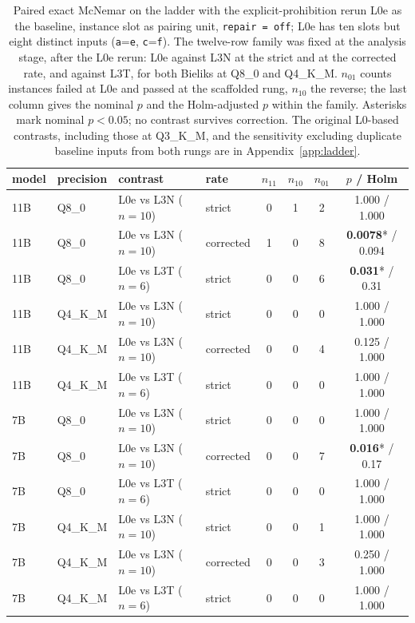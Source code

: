 \documentclass[11pt]{article}
\begin{document}
\begin{table}[h]
\centering\small
\caption{Paired exact McNemar on the ladder with the explicit-prohibition rerun L0e as the baseline, instance slot as pairing unit, \texttt{repair\,=\,off}; L0e has ten slots but eight distinct inputs (\texttt{a}=\texttt{e}, \texttt{c}=\texttt{f}). The twelve-row family was fixed at the analysis stage, after the L0e rerun: L0e against L3N at the strict and at the corrected rate, and against L3T, for both Bieliks at Q8\_0 and Q4\_K\_M. $n_{01}$ counts instances failed at L0e and passed at the scaffolded rung, $n_{10}$ the reverse; the last column gives the nominal $p$ and the Holm-adjusted $p$ within the family. Asterisks mark nominal $p<0.05$; no contrast survives correction. The original L0-based contrasts, including those at Q3\_K\_M, and the sensitivity excluding duplicate baseline inputs from both rungs are in Appendix~\ref{app:ladder}.}
\label{tab:laddermcnemar}
\begin{tabular}{llllcccc}
\toprule
model & precision & contrast & rate & $n_{11}$ & $n_{10}$ & $n_{01}$ & $p$ / Holm \\
\midrule
11B & Q8\_0 & L0e vs L3N ($n=10$) & strict    & 0 & 1 & 2 & 1.000 / 1.000 \\
11B & Q8\_0 & L0e vs L3N ($n=10$) & corrected & 1 & 0 & 8 & \textbf{0.0078}* / 0.094 \\
11B & Q8\_0 & L0e vs L3T ($n=6$)  & strict    & 0 & 0 & 6 & \textbf{0.031}* / 0.31 \\
11B & Q4\_K\_M & L0e vs L3N ($n=10$) & strict    & 0 & 0 & 0 & 1.000 / 1.000 \\
11B & Q4\_K\_M & L0e vs L3N ($n=10$) & corrected & 0 & 0 & 4 & 0.125 / 1.000 \\
11B & Q4\_K\_M & L0e vs L3T ($n=6$)  & strict    & 0 & 0 & 0 & 1.000 / 1.000 \\
7B  & Q8\_0 & L0e vs L3N ($n=10$) & strict    & 0 & 0 & 0 & 1.000 / 1.000 \\
7B  & Q8\_0 & L0e vs L3N ($n=10$) & corrected & 0 & 0 & 7 & \textbf{0.016}* / 0.17 \\
7B  & Q8\_0 & L0e vs L3T ($n=6$)  & strict    & 0 & 0 & 0 & 1.000 / 1.000 \\
7B  & Q4\_K\_M & L0e vs L3N ($n=10$) & strict    & 0 & 0 & 1 & 1.000 / 1.000 \\
7B  & Q4\_K\_M & L0e vs L3N ($n=10$) & corrected & 0 & 0 & 3 & 0.250 / 1.000 \\
7B  & Q4\_K\_M & L0e vs L3T ($n=6$)  & strict    & 0 & 0 & 0 & 1.000 / 1.000 \\
\bottomrule
\end{tabular}
\end{table}
\end{document}
